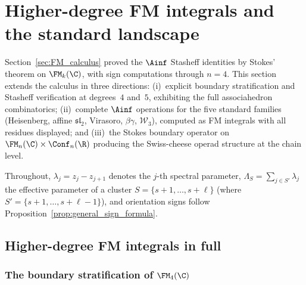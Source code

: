 %

\providecommand{\Res}{\operatorname{Res}}

\section{Higher-degree FM integrals and the standard landscape}

\noindent
Section~\ref{sec:FM_calculus} proved the $\Ainf$ Stasheff identities
by Stokes' theorem on $\FM_k(\C)$, with sign computations
through $n = 4$. This section extends the calculus in three
directions: (i)~explicit boundary stratification and Stasheff
verification at degrees~$4$ and~$5$, exhibiting the full associahedron
combinatorics; (ii)~complete $\Ainf$ operations for
the five standard families (Heisenberg, affine $\mathfrak{sl}_2$,
Virasoro, $\beta\gamma$, $\mathcal{W}_3$), computed as FM integrals
with all residues displayed; and (iii)~the Stokes boundary operator
on $\FM_n(\C) \times \Conf_n(\R)$ producing the
Swiss-cheese operad structure at the chain level.

Throughout, $\lambda_j = z_j - z_{j+1}$ denotes the $j$-th
spectral parameter, $\Lambda_S = \sum_{j \in S'} \lambda_j$ the
effective parameter of a cluster $S = \{s+1, \ldots, s+\ell\}$
(where $S' = \{s+1, \ldots, s+\ell-1\}$), and orientation signs
follow Proposition~\ref{prop:general_sign_formula}.


\subsection{Higher-degree FM integrals in full}

\subsubsection{The boundary stratification of $\FM_4(\C)$}

